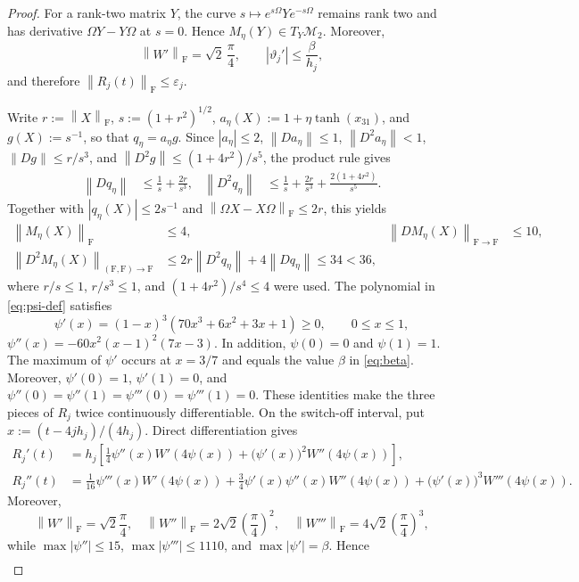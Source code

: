 \documentclass[10pt,a4paper]{amsart}
\numberwithin{equation}{section}
\newcommand{\F}{\mathrm F}
\newcommand{\norm}[1]{\left\lVert #1\right\rVert}
\newcommand{\eps}{\varepsilon}
\begin{document}
\begin{proof}
For a rank-two matrix $Y$, the curve
\(s\mapsto e^{s\Omega}Ye^{-s\Omega}\) remains rank two and has derivative
$\Omega Y-Y\Omega$ at $s=0$.  Hence
$M_\eta(Y)\in T_Y\mathcal M_2$.
Moreover,
\[
 \norm{W'}_{\F}=\sqrt2\,\frac\pi4,
 \qquad |\vartheta_j'|\le\frac\beta {h_j},
\]
and therefore \(\norm{R_j(t)}_{\F}\le\eps_j\).

Write $r:=\norm X_{\F}$, $s:=(1+r^2)^{1/2}$,
$a_\eta(X):=1+\eta\tanh(x_{31})$, and $g(X):=s^{-1}$, so that
$q_\eta=a_\eta g$.  Since $|a_\eta|\le2$,
$\norm{Da_\eta}\le1$, $\norm{D^2a_\eta}<1$,
$\norm{Dg}\le r/s^3$, and
$\norm{D^2g}\le(1+4r^2)/s^5$, the product rule gives
\begin{align*}
 \norm{Dq_\eta}&\le\frac1s+\frac{2r}{s^3},&
 \norm{D^2q_\eta}&\le
 \frac1s+\frac{2r}{s^3}+\frac{2(1+4r^2)}{s^5}.
\end{align*}
Together with $|q_\eta(X)|\le2s^{-1}$ and
$\norm{\Omega X-X\Omega}_{\F}\le2r$, this yields
\begin{align*}
 \norm{M_\eta(X)}_{\F}&\le4,&
 \norm{DM_\eta(X)}_{\F\to\F}&\le10,\\
 \norm{D^2M_\eta(X)}_{(\F,\F)\to\F}
 &\le2r\norm{D^2q_\eta}+4\norm{Dq_\eta}\le34<36,
\end{align*}
where $r/s\le1$, $r/s^3\le1$, and $(1+4r^2)/s^4\le4$ were used.
The polynomial in \eqref{eq:psi-def} satisfies
\[
 \psi'(x)=(1-x)^3(70x^3+6x^2+3x+1)\ge0,
 \qquad 0\le x\le1,
\]
$\psi''(x)=-60x^2(x-1)^2(7x-3)$.  In addition,
$\psi(0)=0$ and $\psi(1)=1$.
The maximum of $\psi'$ occurs at $x=3/7$ and equals the value $\beta$ in
\eqref{eq:beta}.  Moreover,
$\psi'(0)=1$, $\psi'(1)=0$, and
$\psi''(0)=\psi''(1)=\psi'''(0)=\psi'''(1)=0$.  These identities make the three
pieces of $R_j$ twice continuously differentiable.  On the switch-off
interval, put $x:=(t-4jh_j)/(4h_j)$.  Direct differentiation gives
\begin{align}
 R_j'(t)
 &=h_j\left[
 \frac14\psi''(x)W'(4\psi(x))
 +\bigl(\psi'(x)\bigr)^2W''(4\psi(x))\right],
 \label{eq:R-first-derivative}\\
 R_j''(t)
 &=\frac1{16}\psi'''(x)W'(4\psi(x))
 +\frac34\psi'(x)\psi''(x)W''(4\psi(x))
 +\bigl(\psi'(x)\bigr)^3W'''(4\psi(x)).
 \label{eq:R-second-derivative}
\end{align}
Moreover,
\[
 \norm{W'}_{\F}=\sqrt2\frac\pi4,\quad
 \norm{W''}_{\F}=2\sqrt2\left(\frac\pi4\right)^2,\quad
 \norm{W'''}_{\F}=4\sqrt2\left(\frac\pi4\right)^3,
\]
while $\max|\psi''|\le15$, $\max|\psi'''|\le1110$, and
$\max|\psi'|=\beta$.  Hence
\begin{align*}

\end{align*}
\end{proof}
\end{document}
